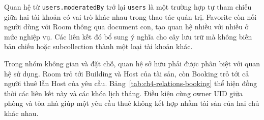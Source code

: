 Quan hệ từ \texttt{users.\allowbreak{}moderated\allowbreak{}By} trở lại \texttt{users} là một trường hợp tự tham chiếu giữa hai tài khoản có vai trò khác nhau trong thao tác quản trị. Favorite còn nối người dùng với Room thông qua document con, tạo quan hệ nhiều với nhiều ở mức nghiệp vụ. Các liên kết đó bổ sung ý nghĩa cho cây lưu trữ mà không biến bản chiếu hoặc subcollection thành một loại tài khoản khác.

Trong nhóm không gian và đặt chỗ, quan hệ sở hữu phải được phân biệt với quan hệ sử dụng. Room trỏ tới Building và Host của tài sản, còn Booking trỏ tới cả người thuê lẫn Host của yêu cầu. Bảng~\ref{tab:ch4-relations-booking} thể hiện đồng thời các liên kết này và các khóa lịch tháng. Điều kiện cùng owner UID giữa phòng và tòa nhà giúp một yêu cầu thuê không kết hợp nhầm tài sản của hai chủ khác nhau.


